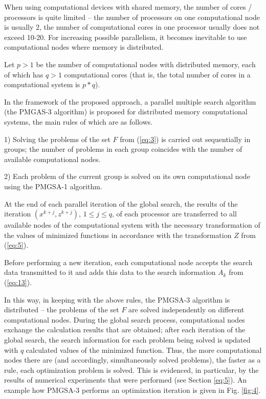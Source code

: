 \documentclass[review]{elsarticle}
\begin{document}
When using computational devices with shared memory, the number of cores / processors is quite limited -- the number of processors on one computational node is usually 2, the number of computational cores in one processor usually does not exceed 10-20. For increasing possible parallelism, it becomes inevitable to use computational nodes where memory is distributed.

Let $p>1$ be the number of computational nodes with distributed memory, each of which has $q>1$ computational cores (that is, the total number of cores in a computational system is $p*q$). 

In the framework of the proposed approach, a parallel multiple search algorithm (the PMGAS-3 algorithm) is proposed for distributed memory computational systems, the main rules of which are as follows.

1) Solving the problems of the set $F$ from (\ref{eq:3}) is carried out sequentially in groups; the number of problems in each group coincides with the number of available computational nodes.

2) Each problem of the current group is solved on its own computational node using the PMGSA-1 algorithm.

At the end of each parallel iteration of the global search, the results of the iteration $(x^{k+j}, z^{k+j})$, $1 \leq j \leq q$, of each processor are transferred to all available nodes of the computational system with the necessary transformation of the values of minimized functions in accordance with the transformation $Z$ from (\ref{eq:5}).
		
Before performing a new iteration, each computational node accepts the search data transmitted to it and adds this data to the search information $A_k$ from (\ref{eq:13}).
	
In this way, in keeping with the above rules, the PMGSA-3 algorithm is distributed -- the problems of the set $F$ are solved independently on different computational nodes. During the global search process, computational nodes exchange the calculation results that are obtained; after each iteration of the global search, the search information for each problem being solved is updated with $q$ calculated values of the minimized function. Thus, the more computational nodes there are (and accordingly, simultaneously solved problems), the faster as a rule, each optimization problem is solved. This is evidenced, in particular, by the results of numerical experiments that were performed (see Section \ref{eq:5}). An example how PMGSA-3 performs an optimization iteration is given in Fig. \ref{fig:4}.
\end{document}
